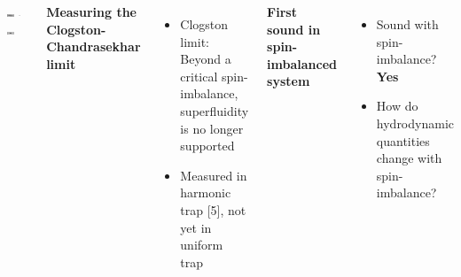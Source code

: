\documentclass[26pt, paperwidth=36in,paperheight=48in]{tikzposter} %
\newcommand{\myfont}{\fontsize{26}{40}\selectfont}
\begin{document}
\begin{columns}
{		\begin{minipage}{0.5\textwidth}
			\hspace{3.0cm}
			\includegraphics[width=0.35\textwidth]{figures_retreat/no_RR_TOF.png}
			\includegraphics[width=0.1\textwidth]{figures_retreat/rightarrow.png}
			\includegraphics[width=0.35\textwidth]{figures_retreat/RR_TOF.png}
		\end{minipage}
		
		
		\vspace{2cm}
		\begin{minipage}{0.5\textwidth}
		\flushleft
		\textbf{Measuring the Clogston-Chandrasekhar limit}
		\vspace{0.5cm}
		\myfont
		\begin{minipage}{\textwidth}
			\flushleft
			\vspace{1.2cm}
			\begin{itemize}
				\item Clogston limit: Beyond a critical spin-imbalance, superfluidity is no longer supported
				\item Measured in harmonic trap [5], not yet in uniform trap
			\end{itemize}
		\end{minipage}
	\end{minipage}

		
	}
	
		
	\block[roundedcorners=0]{\textcolor{BEC1blue}{Outlook}}
	{
		\begin{minipage}{0.4\textwidth}
			\flushleft
			\textbf{First sound in spin-imbalanced system}
			\vspace{0.5cm}
			\myfont
			\begin{itemize}
				\item Sound with spin-imbalance? \textbf{Yes}
				\item How do hydrodynamic quantities change with spin-imbalance?
			\end{itemize}
		\end{minipage}
		
}
\end{columns}
\end{document}
